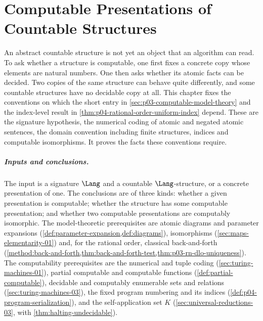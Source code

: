 \chapter{Computable Presentations of Countable Structures}
\label{sec:p03-w03-p03-063-computable-presentations}

An abstract countable structure is not yet an object that an algorithm can
read.  To ask whether a structure is computable, one first fixes a concrete
copy whose elements are natural numbers.  One then asks whether its atomic
facts can be decided.  Two copies of the same structure can behave quite
differently, and some countable structures have no decidable copy at all.
This chapter fixes the conventions on which the short entry in
\cref{sec:p03-computable-model-theory} and the index-level result in
\cref{thm:p04-rational-order-uniform-index} depend.  These are the
signature hypothesis, the numerical coding of atomic and negated atomic
sentences, the domain convention including finite structures, indices and
computable isomorphisms.  It proves the facts these conventions require.

\paragraph{Inputs and conclusions.}
The input is a signature \(\Lang\) and a countable \(\Lang\)-structure, or a
concrete presentation of one.  The conclusions are of three kinds: whether a
given presentation is computable; whether the structure has some computable
presentation; and whether two computable presentations are computably
isomorphic.  The model-theoretic prerequisites are atomic diagrams and
parameter expansions (\cref{def:parameter-expansion,def:diagrams}),
isomorphisms (\cref{sec:maps-elementarity-01}) and, for the rational order,
classical back-and-forth (\cref{method:back-and-forth,thm:back-and-forth-test,thm:p03-rn-dlo-uniqueness}).
The computability prerequisites are the numerical and tuple coding
(\cref{sec:turing-machines-01}), partial
computable and computable functions (\cref{def:partial-computable}),
decidable and computably enumerable sets and relations
(\cref{sec:turing-machines-03}), the fixed
program numbering and its indices (\cref{def:p04-program-serialization}), and the
self-application set \(K\)
(\cref{sec:universal-reductions-03}, with \cref{thm:halting-undecidable}).

